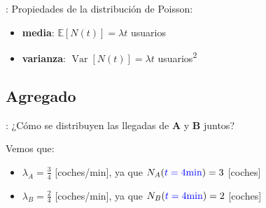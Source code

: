 \documentclass[xcolor={x11names}]{beamer}
\DeclareMathOperator{\Var}{Var}
\newcommand{\red}[1]{{\color{red}#1}}
\newcommand{\blue}[1]{{\color{blue}#1}}
\begin{document}




\begin{frame}{\secname: \subsecname}
    Propiedades de la distribución de Poisson:
    \begin{itemize}
        \item \textbf{media}: $\mathbb{E}[N(t)]=\lambda t$ usuarios
        \item \textbf{varianza}: $\Var[N(t)]=\lambda t$ usuarios\textsuperscript{2}
    \end{itemize}

    \begin{figure}
        
    \end{figure}
\end{frame}




\subsection{Agregado}
\begin{frame}{\secname: \subsecname}
    ¿Cómo se distribuyen las llegadas
    de \textbf{\color{Firebrick1}A} y
    \textbf{\color{Firebrick4}B} juntos?

    \begin{figure}
        
    \end{figure}

    Vemos que:
    \begin{itemize}
        \item {\color{Firebrick1}$\lambda_A=\tfrac{3}{4}$} [coches/min], ya que {\color{HotPink1}$N_A(\blue{t=4\text{min}})=3$} [coches]
        \item {\color{Firebrick4}$\lambda_B=\tfrac{2}{4}$} [coches/min], ya que {\color{HotPink4}$N_B(\blue{t=4\text{min}})=2$} [coches]
    \end{itemize}

\end{frame}
\end{document}
